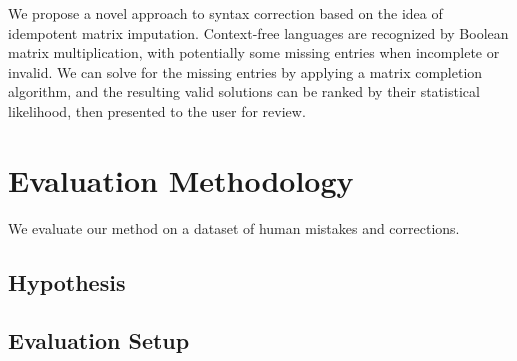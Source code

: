 \documentclass[sigplan,screen]{acmart}
\begin{document}
We propose a novel approach to syntax correction based on the idea of idempotent matrix imputation. Context-free languages are recognized by Boolean matrix multiplication, with potentially some missing entries when incomplete or invalid. We can solve for the missing entries by applying a matrix completion algorithm, and the resulting valid solutions can be ranked by their statistical likelihood, then presented to the user for review.

\section{Evaluation Methodology}


We evaluate our method on a dataset of human mistakes and corrections.

\subsection{Hypothesis}


\subsection{Evaluation Setup}




\end{document}
